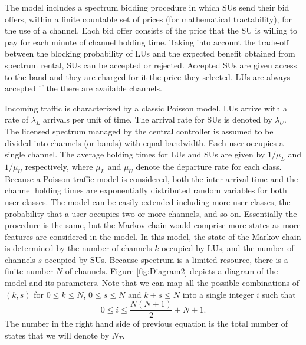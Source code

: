 The model includes a spectrum bidding procedure in which SUs send their bid offers, within a finite countable set of prices (for mathematical tractability), for the use of a channel. Each bid offer consists of the price that the SU is willing to pay for each minute of channel holding time. Taking into account the trade-off between the blocking probability of LUs and the expected benefit obtained from spectrum rental, SUs can be accepted or rejected. Accepted SUs are given access to the band and they are charged for it the price they selected. LUs are always accepted if the there are available channels.

Incoming traffic is characterized by a classic Poisson model. LUs arrive with a rate of $\lambda_{L}$ arrivals per unit of time. The arrival rate for SUs is denoted by $\lambda_{U}$. The licensed spectrum managed by the central controller is assumed to be divided into channels (or bands) with equal bandwidth. Each user occupies a single channel. The average holding times for LUs and SUs are given by $1/\mu_{L}$ and $1/\mu_{U}$ respectively, where $\mu_{L}$ and $\mu_{U}$ denote the departure rate for each class. Because a Poisson traffic model is considered, both the inter-arrival time and the channel holding times are exponentially distributed random variables for both user classes. The model can be easily extended including more user classes, the probability that a user occupies two or more channels, and so on. Essentially the procedure is the same, but the Markov chain would comprise more states as more features are considered in the model. In this model, the state of the Markov chain is determined by the number of channels $k$ occupied by LUs, and the number of channels $s$ occupied by SUs. Because spectrum is a limited resource, there is a finite number $N$ of channels. Figure \ref{fig:Diagram2} depicts a diagram of the model and its parameters. Note that we can map all the possible combinations of $\left(k,s\right)$ for $0\leq k \leq N$, $0\leq s \leq N$ and $k+s \leq N$ into a single integer $i$ such that
\begin{equation}\label{states}
	  0 \leq i \leq \displaystyle\frac{N\left(N+1\right)}{2}+N+1.
\end{equation}
The number in the right hand side of previous equation is the total number of states that we will denote by $N_{T}$.

